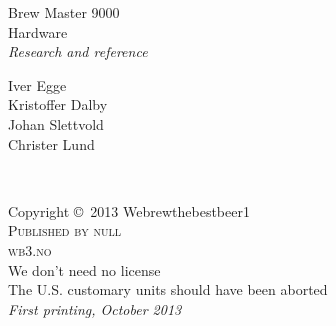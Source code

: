 \documentclass[11pt,fleqn]{book} %
\begin{document}

\begingroup
\thispagestyle{empty}
\centering
\vspace*{9cm}
\par\normalfont\fontsize{35}{35}\sffamily\selectfont
\Huge Brew Master 9000\\
Hardware\\
\textit{Research and reference}\par %
\vspace*{1cm}
{\Large Iver Egge\\
Kristoffer Dalby\\
Johan Slettvold\\
Christer Lund\\} %
\endgroup


\newpage
~\vfill
\thispagestyle{empty}

\noindent Copyright \copyright\ 2013 Webrewthebestbeer1\\ %

\noindent \textsc{Published by null}\\ %

\noindent \textsc{wb3.no}\\ %

\noindent We don't need no license\\ %

\noindent The U.S. customary units should have been aborted\\

\noindent \textit{First printing, October 2013} %



\pagestyle{empty} %
\end{document}
